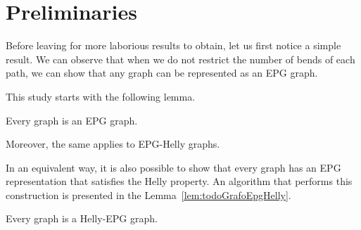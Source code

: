 \section{Preliminaries} \label{sec:prelim}

Before leaving for more laborious results to obtain, let us first notice a simple result. We can observe that when we do not restrict the number of bends of each path, we can show that any graph can be represented as an EPG graph.

This study starts with the following lemma.

\begin{lemma} \label{lem:todoGrafoEpg}
 Every graph is an EPG graph.
 \end{lemma}
 
 Moreover, the same applies to EPG-Helly graphs. 
 
In an equivalent way, it is also possible to show that every graph has an EPG representation that satisfies the Helly property. An algorithm that performs this construction is presented in the Lemma~\ref{lem:todoGrafoEpgHelly}.

 \begin{lemma}\label{lem:todoGrafoEpgHelly}
 Every graph is a Helly-EPG graph.
 \end{lemma}


  

